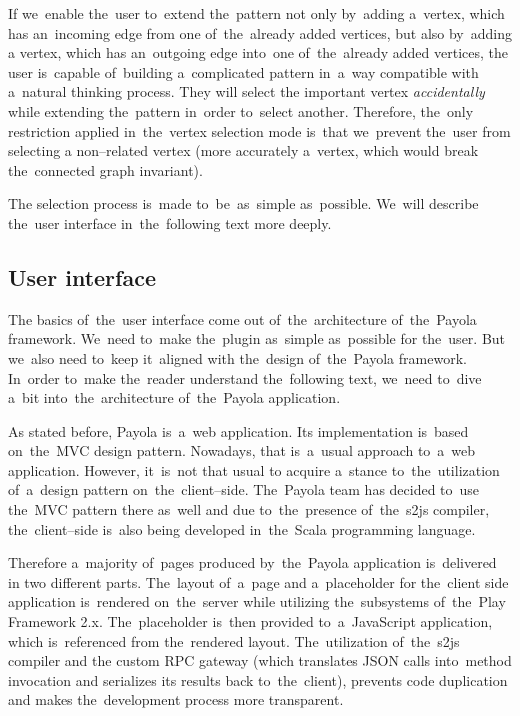 If we~enable the~user to~extend the~pattern not only by~adding a~vertex, 
which has an~incoming edge from one of~the~already added vertices, but also by~adding 
a vertex, which has an~outgoing edge into~one of~the~already added vertices, 
the user is~capable of~building a~complicated pattern in~a~way compatible with a~natural thinking process.
They will select the
important vertex \emph{accidentally} while extending the~pattern in~order to~select another. Therefore, the~only restriction 
applied in~the~vertex selection mode is~that we~prevent the~user from selecting 
a non--related vertex (more accurately a~vertex, which would break the~connected 
graph invariant).

The selection process is~made to~be~as~simple as~possible. We~will describe the~user interface in~the~following text more deeply.

\subsection{User interface}
The basics of~the~user interface come out of~the~architecture of~the~Payola 
framework. We~need to~make the~plugin as~simple as~possible for the~user. But we~also need to~keep it~aligned with the~design of~the~Payola framework. In~order to~make the~reader understand the~following text, we~need to~dive a~bit into~the~architecture of~the~Payola application.

As stated before, Payola is~a~web application. Its implementation is~based on~the~MVC 
design pattern. Nowadays, that is~a~usual approach to~a~web application. However, it~is~not that usual 
to acquire a~stance to~the~utilization of~a~design pattern on~the~client--side. The~Payola team has decided to~use the~MVC pattern there as~well and due to~the~presence of~the~s2js compiler, the~client--side is~also being developed in~the~Scala programming language.

Therefore a~majority of~pages produced by~the~Payola application is~delivered 
in two different parts. The~layout of~a~page and a~placeholder for the~client 
side application is~rendered on~the~server while utilizing the~subsystems of~the~Play Framework 2.x. The~placeholder is~then provided to~a~JavaScript application,
which is~referenced from the~rendered layout. The~utilization of~the~s2js compiler and
the custom RPC gateway (which translates JSON calls into~method invocation and serializes its results
back to~the~client), prevents code duplication and makes the~development process more transparent.

